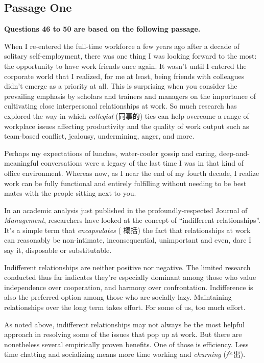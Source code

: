 \documentclass[UTF8,11pt]{ctexart}
\begin{document}
\subsection*{\textbf{Passage One}}


\textbf{Questions 46 to 50 are based on the following passage.}


When I re-entered the full-time workforce a few years ago after a decade of solitary self-employment, there was one thing I was looking forward to the most: the opportunity to have work friends once again. It wasn’t until I entered the corporate world that I realized, for me at least, being friends with colleagues didn’t emerge as a priority at all. This is surprising when you consider the prevailing emphasis by scholars and trainers and managers on the importance of cultivating close interpersonal relationships at work. So much research has explored the way in which\textit{ collegial} (同事的) ties can help overcome a range of workplace issues affecting productivity and the quality of work output such as team-based conflict, jealousy, undermining, anger, and more.


Perhaps my expectations of lunches, water-cooler gossip and caring, deep-and-meaningful conversations were a legacy of the last time I was in that kind of office environment. Whereas now, as I near the end of my fourth decade, I realize work can be fully functional and entirely fulfilling without needing to be best mates with the people sitting next to you.


In an academic analysis just published in the profoundly-respected Journal of\textit{ Management}, researchers have looked at the concept of “indifferent relationships”. It’s a simple term that\textit{ encapsulates} ( 概括) the fact that relationships at work can reasonably be non-intimate, inconsequential, unimportant and even, dare I say it, disposable or substitutable.


Indifferent relationships are neither positive nor negative. The limited research conducted thus far indicates they’re especially dominant among those who value independence over cooperation, and harmony over confrontation. Indifference is also the preferred option among those who are socially lazy. Maintaining relationships over the long term takes effort. For some of us, too much effort.


As noted above, indifferent relationships may not always be the most helpful approach in resolving some of the issues that pop up at work. But there are nonetheless several empirically proven benefits. One of those is efficiency. Less time chatting and socializing means more time working and\textit{ churning} (产出).
\end{document}
